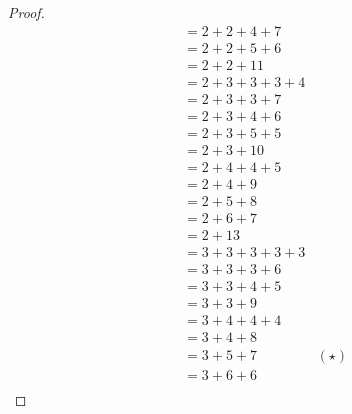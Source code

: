 \begin{proof}
\begin{align*}
           & = 2 + 2 + 4 + 7                                                       \\
           & = 2 + 2 + 5 + 6                                                       \\
           & = 2 + 2 + 11                                                          \\
           & = 2 + 3 + 3 + 3 + 4                                                   \\
           & = 2 + 3 + 3 + 7                                                       \\
           & = 2 + 3 + 4 + 6                                                       \\
           & = 2 + 3 + 5 + 5                                                       \\
           & = 2 + 3 + 10                                                          \\
           & = 2 + 4 + 4 + 5                                                       \\
           & = 2 + 4 + 9                                                           \\
           & = 2 + 5 + 8                                                           \\
           & = 2 + 6 + 7                                                           \\
           & = 2 + 13                                                              \\
           & = 3 + 3 + 3 + 3 + 3                                                   \\
           & = 3 + 3 + 3 + 6                                                       \\
           & = 3 + 3 + 4 + 5                                                       \\
           & = 3 + 3 + 9                                                           \\
           & = 3 + 4 + 4 + 4                                                       \\
           & = 3 + 4 + 8                                                           \\
           & = 3 + 5 + 7                                                 & (\star) \\
           & = 3 + 6 + 6                                                           \\

\end{align*}
\end{proof}
